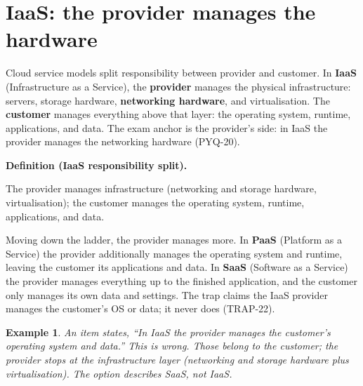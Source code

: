 \documentclass[11pt]{article}
\newtheorem{example}{Example}[section]
\newenvironment{definitionbox}[1]{%
  \par\noindent\textbf{Definition (#1).}\ \itshape
}{\par\vspace{0.3em}}
\begin{document}
\section{IaaS: the provider manages the hardware}
Cloud service models split responsibility between provider and customer.
In \textbf{IaaS} (Infrastructure as a Service), the \textbf{provider} manages
the physical infrastructure: servers, storage hardware, \textbf{networking
hardware}, and virtualisation. The \textbf{customer} manages everything above
that layer: the operating system, runtime, applications, and data. The exam
anchor is the provider's side: in IaaS the provider manages the networking
hardware (PYQ-20).

\begin{definitionbox}{IaaS responsibility split}
The provider manages infrastructure (networking and storage hardware,
virtualisation); the customer manages the operating system, runtime,
applications, and data.
\end{definitionbox}

Moving down the ladder, the provider manages more. In \textbf{PaaS}
(Platform as a Service) the provider additionally manages the operating
system and runtime, leaving the customer its applications and data. In
\textbf{SaaS} (Software as a Service) the provider manages everything up to
the finished application, and the customer only manages its own data and
settings. The trap claims the IaaS provider manages the customer's OS or
data; it never does (TRAP-22).

\begin{example}
An item states, ``In IaaS the provider manages the customer's operating
system and data.'' This is wrong. Those belong to the customer; the provider
stops at the infrastructure layer (networking and storage hardware plus
virtualisation). The option describes SaaS, not IaaS.
\end{example}
\end{document}
